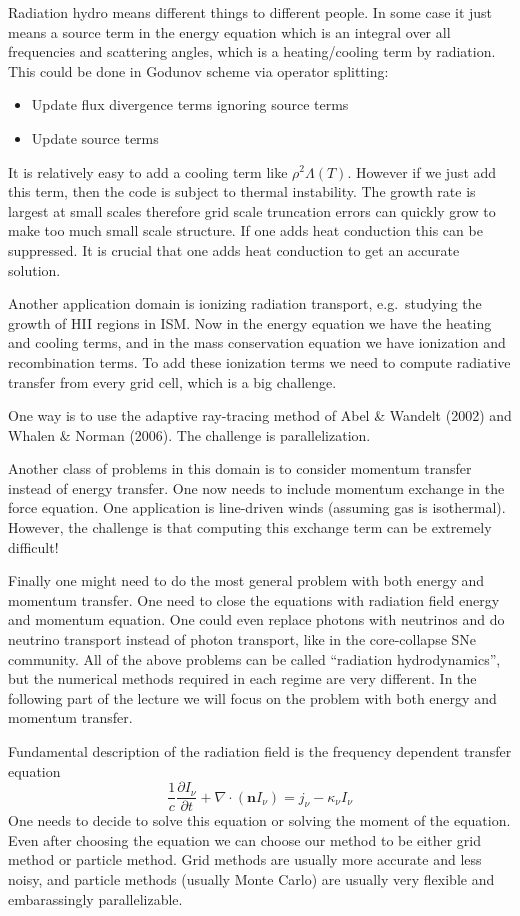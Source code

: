 \documentclass[letterpaper, 11pt]{article}
\numberwithin{equation}{section}
\numberwithin{figure}{section}
\begin{document}
Radiation hydro means different things to different people. In some case it just
means a source term in the energy equation which is an integral over all
frequencies and scattering angles, which is a heating/cooling term by radiation.
This could be done in Godunov scheme via operator splitting:
\begin{itemize}
\item Update flux divergence terms ignoring source terms
    \item Update source terms
\end{itemize}
It is relatively easy to add a cooling term like $\rho^2\Lambda(T)$. However if
we just add this term, then the code is subject to thermal instability. The
growth rate is largest at small scales therefore grid scale truncation errors
can quickly grow to make too much small scale structure. If one adds heat
conduction this can be suppressed. It is crucial that one adds heat conduction
to get an accurate solution.

Another application domain is ionizing radiation transport, e.g.\ studying the
growth of HII regions in ISM. Now in the energy equation we have the heating and
cooling terms, and in the mass conservation equation we have ionization and
recombination terms. To add these ionization terms we need to compute radiative
transfer from every grid cell, which is a big challenge.

One way is to use the adaptive ray-tracing method of Abel \& Wandelt (2002) and
Whalen \& Norman (2006). The challenge is parallelization.

Another class of problems in this domain is to consider momentum transfer
instead of energy transfer. One now needs to include momentum exchange in the
force equation. One application is line-driven winds (assuming gas is
isothermal). However, the challenge is that computing this exchange term can be
extremely difficult!

Finally one might need to do the most general problem with both energy and
momentum transfer. One need to close the equations with radiation field energy
and momentum equation. One could even replace photons with neutrinos and do
neutrino transport instead of photon transport, like in the core-collapse SNe
community. All of the above problems can be called ``radiation hydrodynamics'',
but the numerical methods required in each regime are very different. In the
following part of the lecture we will focus on the problem with both energy and
momentum transfer.

Fundamental description of the radiation field is the frequency dependent
transfer equation
\begin{equation}
  \label{eq:14}
  \frac{1}{c}\frac{\partial I_{\nu}}{\partial t} + \nabla\cdot(\mathbf{n} I_{\nu}) = j_{\nu} - \kappa_{\nu}I_{\nu}
\end{equation}
One needs to decide to solve this equation or solving the moment of the
equation. Even after choosing the equation we can choose our method to be either
grid method or particle method. Grid methods are usually more accurate and less
noisy, and particle methods (usually Monte Carlo) are usually very flexible and
embarassingly parallelizable.
\end{document}
